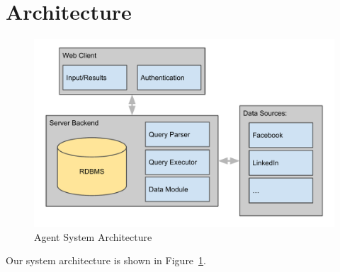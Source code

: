 \section{Architecture}
\label{sec:architecture}

\begin{figure}[!h]
\includegraphics[width=\linewidth]{figs/sysarch.pdf}
\caption{Agent System Architecture}
\label{fig:sysarch}
\end{figure}

Our system architecture is shown in Figure~\ref{fig:sysarch}.

